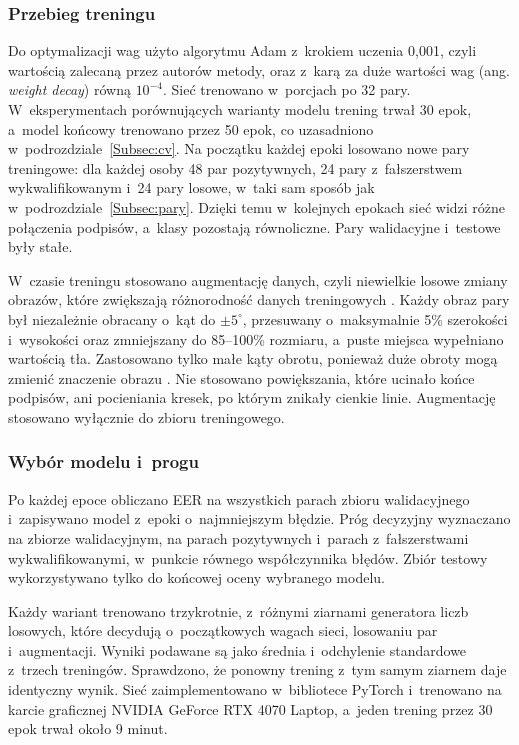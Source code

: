 \documentclass[12pt, twoside, openright]{article}
\begin{document}
\subsubsection*{Przebieg treningu}

Do optymalizacji wag użyto algorytmu Adam \cite{kingma2015} z~krokiem uczenia 0,001, czyli wartością zalecaną przez autorów metody, oraz z~karą za duże wartości wag (ang. \textit{weight decay}) równą $10^{-4}$.
Sieć trenowano w~porcjach po 32 pary.
W~eksperymentach porównujących warianty modelu trening trwał 30 epok, a~model końcowy trenowano przez 50 epok, co uzasadniono w~podrozdziale~\ref{Subsec:cv}.
Na początku każdej epoki losowano nowe pary treningowe: dla każdej osoby 48 par pozytywnych, 24 pary z~fałszerstwem wykwalifikowanym i~24 pary losowe, w~taki sam sposób jak w~podrozdziale~\ref{Subsec:pary}.
Dzięki temu w~kolejnych epokach sieć widzi różne połączenia podpisów, a~klasy pozostają równoliczne.
Pary walidacyjne i~testowe były stałe.

W~czasie treningu stosowano augmentację danych, czyli niewielkie losowe zmiany obrazów, które zwiększają różnorodność danych treningowych \cite{shorten2019}.
Każdy obraz pary był niezależnie obracany o~kąt do $\pm5^\circ$, przesuwany o~maksymalnie 5\% szerokości i~wysokości oraz zmniejszany do 85--100\% rozmiaru, a~puste miejsca wypełniano wartością tła.
Zastosowano tylko małe kąty obrotu, ponieważ duże obroty mogą zmienić znaczenie obrazu \cite{shorten2019}.
Nie stosowano powiększania, które ucinało końce podpisów, ani pocieniania kresek, po którym znikały cienkie linie.
Augmentację stosowano wyłącznie do zbioru treningowego.

\subsubsection*{Wybór modelu i~progu}

Po każdej epoce obliczano EER na wszystkich parach zbioru walidacyjnego i~zapisywano model z~epoki o~najmniejszym błędzie.
Próg decyzyjny wyznaczano na zbiorze walidacyjnym, na parach pozytywnych i~parach z~fałszerstwami wykwalifikowanymi, w~punkcie równego współczynnika błędów.
Zbiór testowy wykorzystywano tylko do końcowej oceny wybranego modelu.

Każdy wariant trenowano trzykrotnie, z~różnymi ziarnami generatora liczb losowych, które decydują o~początkowych wagach sieci, losowaniu par i~augmentacji.
Wyniki podawane są jako średnia i~odchylenie standardowe z~trzech treningów.
Sprawdzono, że ponowny trening z~tym samym ziarnem daje identyczny wynik.
Sieć zaimplementowano w~bibliotece PyTorch i~trenowano na karcie graficznej NVIDIA GeForce RTX 4070 Laptop, a~jeden trening przez 30 epok trwał około 9 minut.
\end{document}
